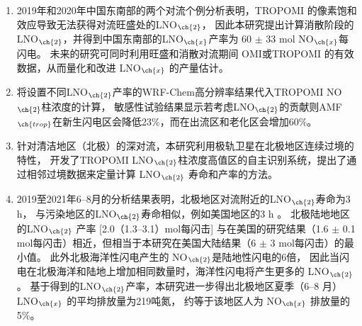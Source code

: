 \begin{enumerate}[label=（\arabic*）, labelindent=\parindent, nosep, leftmargin=0pt, widest=0, itemindent=*, topsep=0pt, partopsep=0pt, parsep=0pt]

\item 2019年和2020年中国东南部的两个对流个例分析表明，TROPOMI 的像素饱和效应导致无法获得对流旺盛处的LNO$_{\ch{2}}$，
因此本研究提出计算消散阶段的LNO$_{\ch{2}}$，并得到中国东南部的LNO$_{\ch{x}}$产率为 60 $\pm$ 33 mol NO$_{\ch{x}}$每闪电。
未来的研究可同时利用旺盛和消散对流期间 OMI或TROPOMI 的有效数据，从而量化和改进 LNO$_{\ch{x}}$ 的产量估计。

\item 将设置不同LNO$_{\ch{2}}$产率的WRF-Chem高分辨率结果代入TROPOMI NO$_{\ch{2}}$柱浓度的计算，
敏感性试验结果显示若考虑LNO$_{\ch{2}}$的贡献则AMF$_{\ch{trop}}$在新生闪电区会降低23\%，而在出流区和老化区会增加60\%。

\item 针对清洁地区（北极）的深对流，本研究利用极轨卫星在北极地区连续过境的特性，
开发了TROPOMI LNO$_{\ch{2}}$柱浓度高值区的自主识别系统，提出了通过相邻过境数据来定量计算 LNO$_{\ch{2}}$ 寿命和产率的方法。

\item 2019至2021年6--8月的分析结果表明，北极地区对流附近的LNO$_{\ch{2}}$寿命为3 h，
与污染地区的LNO$_{\ch{2}}$寿命相似，例如美国地区的3 h \citep{Nault.2017}。
北极陆地地区的LNO$_{\ch{2}}$ 产率 [2.0（1.3--3.1）mol每闪击] 与\citet{Lapierre.2020}在美国的研究结果（1.6 $\pm$ 0.1 mol每闪击）相近，但相当于本研究在美国大陆结果（6 $\pm$ 3 mol每闪击）的最小值。
此外北极海洋性闪电产生的 NO$_{\ch{2}}$是陆地性闪电的6倍，
因此当闪电在北极海洋和陆地上增加相同数量时，海洋性闪电将产生更多的 LNO$_{\ch{2}}$。
基于得到的LNO$_{\ch{2}}$产率，本研究进一步得出北极地区夏季（6--8 月）LNO$_{\ch{x}}$ 的平均排放量为219吨氮，
约等于该地区人为 NO$_{\ch{x}}$ 排放量的 5\%。

\end{enumerate}


